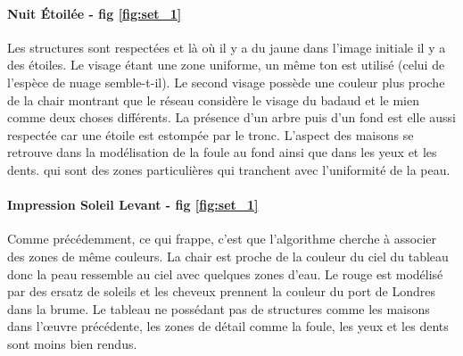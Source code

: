 \documentclass{article}
\begin{document}
\paragraph*{Nuit Étoilée - fig \ref{fig:set_1}} Les structures sont respectées et là où il y a du jaune dans l'image initiale il y a des étoiles. Le visage étant une zone uniforme, un même ton est utilisé (celui de l'espèce de nuage semble-t-il). Le second visage possède une couleur plus proche de la chair montrant que le réseau considère le visage du badaud et le mien comme deux choses différents. La présence d'un arbre puis d'un fond est elle aussi respectée car une étoile est estompée par le tronc. L'aspect des maisons se retrouve dans la modélisation de la foule au fond ainsi que dans les yeux et les dents. qui sont des zones particulières qui tranchent avec l'uniformité de la peau.

\paragraph*{Impression Soleil Levant - fig \ref{fig:set_1}} Comme précédemment, ce qui frappe, c'est que l'algorithme cherche à associer des zones de même couleurs. La chair est proche de la couleur du ciel du tableau donc la peau ressemble au ciel avec quelques zones d'eau. Le rouge est modélisé par des ersatz de soleils et les cheveux prennent la couleur du port de Londres dans la brume. Le tableau ne possédant pas de structures comme les maisons dans l’œuvre précédente, les zones de détail comme la foule, les yeux et les dents sont moins bien rendus.
\end{document}
